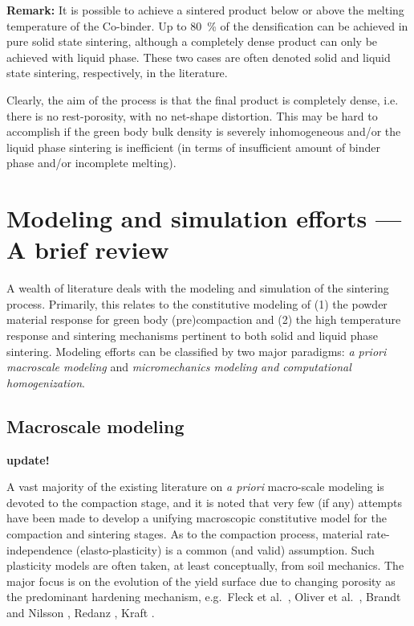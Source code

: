 \documentclass[MikaelDissertation.tex]{subfiles}
\begin{document}
\textbf{Remark:} It is possible to achieve a sintered product below or above the melting temperature of the Co-binder.
Up to \SI{80}{\percent} of the densification can be achieved in pure solid state sintering, although a completely dense product can only be achieved with liquid phase.
These two cases are often denoted solid and liquid state sintering, respectively, in the literature.


Clearly, the aim of the process is that the final product is completely dense, i.e. there is no rest-porosity, with no net-shape distortion.
This may be hard to accomplish if the green body bulk density is severely inhomogeneous and/or the liquid phase sintering is inefficient (in terms of insufficient amount of binder phase and/or incomplete melting).

\section{Modeling and simulation efforts --- A brief review}

A wealth of literature deals with the modeling and simulation of the sintering process.
Primarily, this relates to the constitutive modeling of
(1) the powder material response for green body (pre)compaction and 
(2) the high temperature response and sintering mechanisms pertinent to both solid and liquid phase sintering.
Modeling efforts can be classified by two major paradigms: \emph{a priori macroscale modeling} and \emph{micromechanics modeling and computational homogenization}.

\subsection{Macroscale modeling}
\textbf{update!}

A vast majority of the existing literature on \emph{a priori} macro-scale modeling is devoted to the compaction stage, and it is noted that very few (if any) attempts have been made to develop a unifying macroscopic constitutive model for the compaction and sintering stages.
As to the compaction process, material rate-independence (elasto-plasticity) is a common (and valid) assumption.
Such plasticity models are often taken, at least conceptually, from soil mechanics.
The major focus is on the evolution of the yield surface due to changing porosity as the predominant hardening mechanism, e.g.\ Fleck et al.\ \cite{fleck_yielding_1992},
Oliver et al.\ \cite{oliver_plasticity_1996}, Brandt and Nilsson \cite{brandt_fe-simulation_1998}, Redanz \cite{redanz_numerical_1998}, Kraft \cite{kraft_optimizing_2003}.
\end{document}
